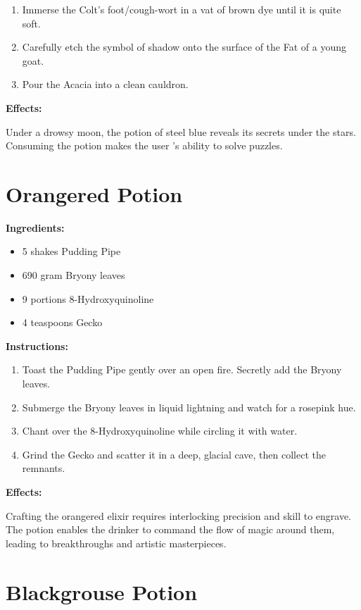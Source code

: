 \documentclass{article}
\begin{document}
\begin{enumerate}
  \item Immerse the Colt's foot/cough-wort in a vat of brown dye until it is quite soft.
  \item Carefully etch the symbol of shadow onto the surface of the Fat of a young goat.
  \item Pour the Acacia into a clean cauldron.
\end{enumerate}

\textbf{Effects:}

Under a drowsy moon, the potion of steel blue reveals its secrets under the stars. Consuming the potion makes the user 's ability to solve puzzles.

\newpage
\section*{Orangered Potion}

\textbf{Ingredients:}

\begin{itemize}
  \item 5 shakes Pudding Pipe
  \item 690 gram Bryony leaves
  \item 9 portions 8-Hydroxyquinoline
  \item 4 teaspoons Gecko
\end{itemize}

\textbf{Instructions:}

\begin{enumerate}
  \item Toast the Pudding Pipe gently over an open fire. Secretly add the Bryony leaves.
  \item Submerge the Bryony leaves in liquid lightning and watch for a rosepink hue.
  \item Chant over the 8-Hydroxyquinoline while circling it with water.
  \item Grind the Gecko and scatter it in a deep, glacial cave, then collect the remnants.
\end{enumerate}

\textbf{Effects:}

Crafting the orangered elixir requires interlocking precision and skill to engrave. The potion enables the drinker to command the flow of magic around them, leading to breakthroughs and artistic masterpieces.

\newpage
\section*{Blackgrouse Potion}
\end{document}
